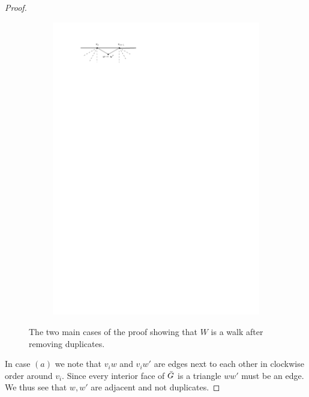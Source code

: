 \begin{proof}
\begin{figure}
\begin{subfigure}[b]{0.5\linewidth}
        \caption{}
    \end{subfigure}%
    \begin{subfigure}[b]{0.5\linewidth}
        \includegraphics[width=\linewidth]{redAlgo/img/walkProofB}
        \vspace{1cm}   
                
        \caption{}
    \end{subfigure}

    	\caption{The two main cases of the proof showing that $W$ is a walk after removing duplicates.}
	\label{fig:walkproof}
\end{figure}


In case $(a)$ we note that $v_i w$ and $v_i w'$ are edges next to each other in clockwise order around $v_i$. Since every interior face of $\bar{G}$ is a triangle $ww'$ must be an edge. We thus see that $w, w'$ are adjacent and not duplicates.


\end{proof}
